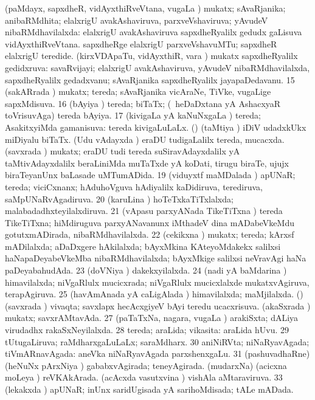 \banum
{} (paMdayx, sapxdheR, vidAyxthiRveVtana, \mo vugaLa \vi) mukatx; sAvaRjanika; anibaRMdhita; elalxrigU avakAshaviruva, parxveVshaviruva; yAvudeV nibaRMdhavilalxda:  elalxrigU avakAshaviruva sapxdheRyalilx gedudx gaLisuva vidAyxthiRveVtana.  sapxdheRge elalxrigU parxveVshavuMTu; sapxdheR elalxrigU teredide. 
 (kirxVDApaTu, vidAyxthiR, \mo vara \vi) mukatx sapxdheRyalilx gedidxruva:  savaRvijayi; elalxrigU avakAshaviruva, yAvudeV nibaRMdhavilalxda, sapxdheRyalilx gedadxvanu; sAvaRjanika sapxdheRyalilx jayapaDedavanu. 
\eanum
\numie
\num{15} (sakARrada \vi) mukatx; tereda; sAvaRjanika vicAraNe, TiVke, \mo vugaLige sapxMdisuva. 
\num{16} (bAyiya \vi) tereda; biTaTx; (\kanmu\ heDaDxtana yA AshacxyaR toVrisuvAga) tereda bAyiya. 
\num{17} (kivigaLa yA kaNuNxgaLa \vi) tereda; AsakitxyiMda gamanisuva:  tereda kivigaLuLaLx. 
 (\saM) 
\banum
{} (taMtiya \vi) iDiV udadxkUkx miDiyalu biTaTx. 
 (Udu vAdayxda \vi) eraDU tudigaLalilx tereda, mucacxda. 
 (savxrada \vi) mukatx; eraDU tudi tereda suSiravAdayxdalilx yA taMtivAdayxdalilx beraLiniMda muTaTxde yA koDati, tirugu biraTe, ujujx biraTeyanUnx baLasade uMTumADida. 
\eanum
\numie
\num{19} (viduyxtf maMDalada \vi) apUNaR; tereda; viciCxnanx; hAduhoVguva hAdiyalilx kaDidiruva, terediruva, saMpUNaRvAgadiruva. 
\num{20} (karuLina \vi) hoTeTxkaTiTxlalxda; malabadadhxteyilalxdiruva. 
\num{21} (vApasu parxyANada TikeTiTxna \vi) tereda TikeTiTxna; hiMdiruguva parxyANavanunx iMthadeV dina mADabeVkeMdu gotutxmADirada, nibaRMdhavilalxda. 
\num{22} (cekikxna \vi) mukatx; tereda; kArxsf mADilalxda; aDaDxgere hAkilalxda; bAyxMkina KAteyoMdakekx salilxsi haNapaDeyabeVkeMba nibaRMdhavilalxda; bAyxMkige salilxsi neVravAgi haNa paDeyabahudAda. 
\num{23} (doVNiya \vi) dakekxyilalxda. 
\num{24} (nadi yA baMdarina \vi) himavilalxda; niVgaRlulx mucicxrada; niVgaRlulx mucicxlalxde mukatxvAgiruva, terapAgiruva. 
\num{25} (havAmAnada yA caLigAlada \vi) himavilalxda; maMjilalxda. 
 (\dhavxni) 
\banum
{} (savxrada \vi) vivaqta; savxlapx hecAcxgiyeV bAyi teredu ucacxrisuva. 
 (akaSxrada \vi) mukatx; savxrAMtavAda. 
\eanum
\numie
\num{27} (paTaTxNa, nagara, \mo vugaLa \vi) arakiSxta; dALiya virudadhx rakaSxNeyilalxda. 
\num{28} tereda; araLida; vikasita:  araLida hUvu. 
\num{29} tUtugaLiruva; raMdharxgaLuLaLx; saraMdharx. 
\num{30} aniNiRVta; niNaRyavAgada; tiVmARnavAgada:  aneVka niNaRyavAgada parxshenxgaLu. 
\num{31} (pashuvadhaRne) (heNuNx pArxNiya \vi) gababxvAgirada; teneyAgirada. 
 (mudarxNa) 
\banum
{} (acicxna moLeya \vi) reVKAkArada. 
 (acAcxda vasutxvina \vi) vishAla aMtaraviruva. 
\eanum
\numie
\num{33} (lekakxda \vi) apUNaR; inUnx saridUgisada yA sarihoMdisada; tALe mADada. 
\enum
\emng

